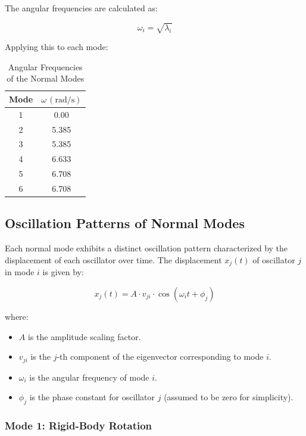 \documentclass[12pt]{report} %
\begin{document}
The angular frequencies are calculated as:

\[
\omega_i = \sqrt{\lambda_i}
\]

Applying this to each mode:

\begin{table}[h]
    \centering
    \caption{Angular Frequencies of the Normal Modes}
    \label{tab:angular_frequencies_part4}
    \begin{tabular}{|c|c|}
        \hline
        \textbf{Mode} & \(\omega \, (\text{rad/s})\) \\
        \hline
        1 & 0.00 \\
        2 & 5.385 \\
        3 & 5.385 \\
        4 & 6.633 \\
        5 & 6.708 \\
        6 & 6.708 \\
        \hline
    \end{tabular}
\end{table}

\subsection{Oscillation Patterns of Normal Modes}
\label{subsec:part4_oscillation_patterns}

Each normal mode exhibits a distinct oscillation pattern characterized by the displacement of each oscillator over time. The displacement \( x_j(t) \) of oscillator \( j \) in mode \( i \) is given by:

\[
x_j(t) = A \cdot v_{ji} \cdot \cos(\omega_i t + \phi_j)
\]

where:
\begin{itemize}
    \item \( A \) is the amplitude scaling factor.
    \item \( v_{ji} \) is the \( j \)-th component of the eigenvector corresponding to mode \( i \).
    \item \( \omega_i \) is the angular frequency of mode \( i \).
    \item \( \phi_j \) is the phase constant for oscillator \( j \) (assumed to be zero for simplicity).
\end{itemize}

\subsubsection{Mode 1: Rigid-Body Rotation}
\label{subsubsec:part4_mode1}
\end{document}

